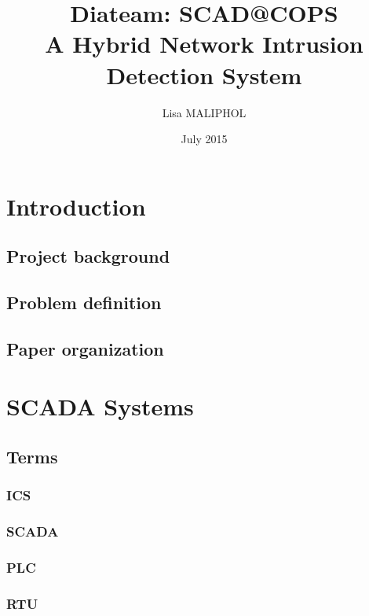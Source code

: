 \documentclass[]{article}
\title{Diateam: SCAD@COPS\\A Hybrid Network Intrusion Detection System}
\author{Lisa MALIPHOL}
\date{July 2015}
\begin{document}
\maketitle


{
\hypersetup{linkcolor=black}
\setcounter{tocdepth}{2}
\tableofcontents
}
\section{Introduction}\label{introduction}

\subsection{Project background}\label{project-background}

\subsection{Problem definition}\label{problem-definition}

\subsection{Paper organization}\label{paper-organization}

\section{SCADA Systems}\label{scada-systems}

\subsection{Terms}\label{terms}

\subsubsection{ICS}\label{ics}

\subsubsection{SCADA}\label{scada}

\subsubsection{PLC}\label{plc}

\subsubsection{RTU}\label{rtu}
\end{document}
